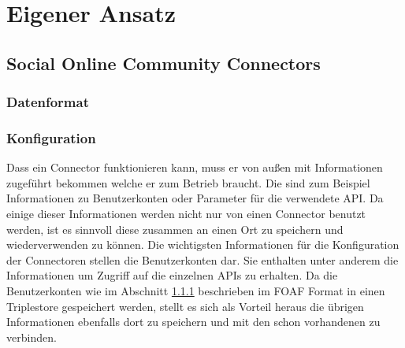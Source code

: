 
\chapter{Eigener Ansatz} %
\label{cha:eigener_ansatz}



\section{Social Online Community Connectors} %
\label{sec:social_online_community_connectors}

\subsection{Datenformat} %
\label{sub:datenformat}



\subsection{Konfiguration} %
\label{sub:konfiguration}



Dass ein Connector funktionieren kann, muss er von außen mit Informationen zugeführt bekommen welche er zum Betrieb braucht. Die sind zum Beispiel Informationen zu Benutzerkonten oder Parameter für die verwendete API. Da einige dieser Informationen werden nicht nur von einen Connector benutzt werden, ist es sinnvoll diese zusammen an einen Ort zu speichern und wiederverwenden zu können. Die wichtigsten Informationen für die Konfiguration der Connectoren stellen die Benutzerkonten dar. Sie enthalten unter anderem die Informationen um Zugriff auf die einzelnen APIs zu erhalten. Da die Benutzerkonten wie im Abschnitt \ref{sub:datenformat} beschrieben im FOAF Format in einen Triplestore gespeichert werden, stellt es sich als Vorteil heraus die übrigen Informationen ebenfalls dort zu speichern und mit den schon vorhandenen zu verbinden. 

\medskip

